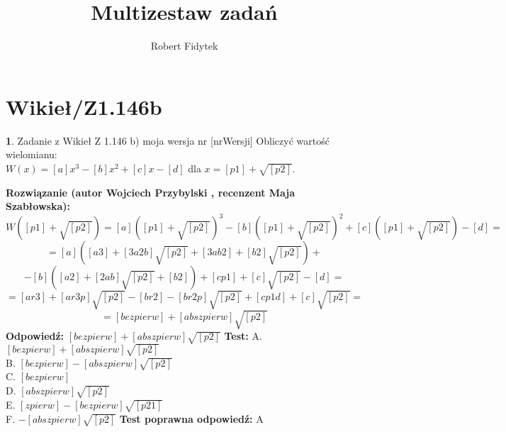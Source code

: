 \documentclass[12pt, a4paper]{article}
\title{Multizestaw zadań}
\author{Robert Fidytek}
\date{}
\theoremstyle{definition} %
\newtheorem{zad}{}
\newcommand{\kategoria}[1]{\section{#1}} %
\newcommand{\zadStart}[1]{\begin{zad}#1\newline} %
\newcommand{\zadStop}{\end{zad}}   %
\newcommand{\rozwStart}[2]{\noindent \textbf{Rozwiązanie (autor #1 , recenzent #2): }\newline} %
\newcommand{\rozwStop}{\newline}                                            %
\newcommand{\odpStart}{\noindent \textbf{Odpowiedź:}\newline}    %
\newcommand{\odpStop}{\newline}                                             %
\newcommand{\testStart}{\noindent \textbf{Test:}\newline} %
\newcommand{\testStop}{\newline} %
\newcommand{\kluczStart}{\noindent \textbf{Test poprawna odpowiedź:}\newline} %
\newcommand{\kluczStop}{\newline} %
\begin{document}
\maketitle


\kategoria{Wikieł/Z1.146b}
\zadStart{Zadanie z Wikieł Z 1.146 b) moja wersja nr [nrWersji]}
Obliczyć wartość wielomianu:\\ $W(x)=[a]x^{3}-[b]x^{2}+[c]x-[d]$ dla $x=[p1]+\sqrt{[p2]}$.
\zadStop
\rozwStart{Wojciech Przybylski}{Maja Szabłowska}
$$W([p1]+\sqrt{[p2]})=[a]([p1]+\sqrt{[p2]})^{3}-[b]([p1]+\sqrt{[p2]})^{2}+[c]([p1]+\sqrt{[p2]})-[d]=$$
$$=[a]([a3]+[3a2b]\sqrt{[p2]}+[3ab2]+[b2]\sqrt{[p2]})+$$
$$-[b]([a2]+[2ab]\sqrt{[p2]}+[b2])+[cp1]+[c]\sqrt{[p2]}-[d]=$$
$$=[ar3]+[ar3p]\sqrt{[p2]}-[br2]-[br2p]\sqrt{[p2]}+[cp1d]+[c]\sqrt{[p2]}=$$
$$=[bezpierw]+[abszpierw]\sqrt{[p2]}$$
\rozwStop
\odpStart
$[bezpierw]+[abszpierw]\sqrt{[p2]}$
\odpStop
\testStart
A. $[bezpierw]+[abszpierw]\sqrt{[p2]}$\\
B. $[bezpierw]-[abszpierw]\sqrt{[p2]}$\\
C. $[bezpierw]$\\
D. $[abszpierw]\sqrt{[p2]}$\\
E. $[zpierw]-[bezpierw]\sqrt{[p21]}$\\
F. $-[abszpierw]\sqrt{[p2]}$
\testStop
\kluczStart
A
\kluczStop
\end{document}
